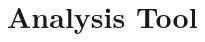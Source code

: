 \documentclass[titlepage,11pt]{article}
\begin{document}













\clearpage

\section{\label{Analysis}Analysis Tool}
\end{document}
